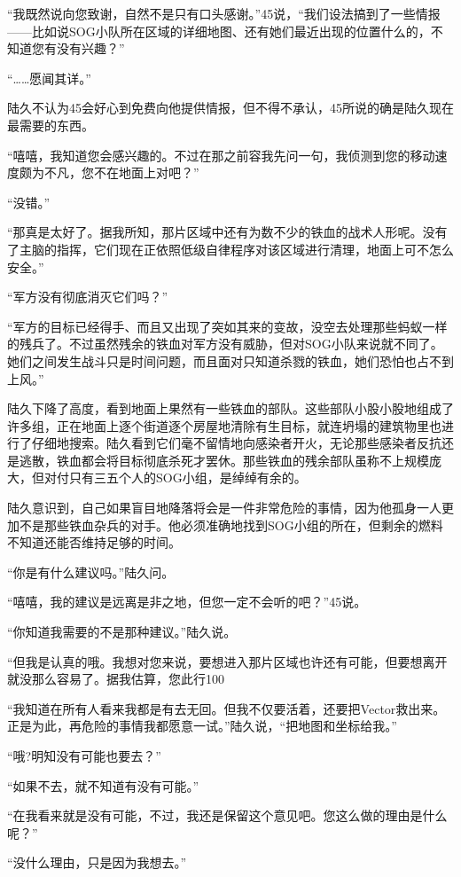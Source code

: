“我既然说向您致谢，自然不是只有口头感谢。”45说，“我们设法搞到了一些情报——比如说SOG小队所在区域的详细地图、还有她们最近出现的位置什么的，不知道您有没有兴趣？”

“……愿闻其详。”

陆久不认为45会好心到免费向他提供情报，但不得不承认，45所说的确是陆久现在最需要的东西。

“嘻嘻，我知道您会感兴趣的。不过在那之前容我先问一句，我侦测到您的移动速度颇为不凡，您不在地面上对吧？”

“没错。”

“那真是太好了。据我所知，那片区域中还有为数不少的铁血的战术人形呢。没有了主脑的指挥，它们现在正依照低级自律程序对该区域进行清理，地面上可不怎么安全。”

“军方没有彻底消灭它们吗？”

“军方的目标已经得手、而且又出现了突如其来的变故，没空去处理那些蚂蚁一样的残兵了。不过虽然残余的铁血对军方没有威胁，但对SOG小队来说就不同了。她们之间发生战斗只是时间问题，而且面对只知道杀戮的铁血，她们恐怕也占不到上风。”

陆久下降了高度，看到地面上果然有一些铁血的部队。这些部队小股小股地组成了许多组，正在地面上逐个街道逐个房屋地清除有生目标，就连坍塌的建筑物里也进行了仔细地搜索。陆久看到它们毫不留情地向感染者开火，无论那些感染者反抗还是逃散，铁血都会将目标彻底杀死才罢休。那些铁血的残余部队虽称不上规模庞大，但对付只有三五个人的SOG小组，是绰绰有余的。

陆久意识到，自己如果盲目地降落将会是一件非常危险的事情，因为他孤身一人更加不是那些铁血杂兵的对手。他必须准确地找到SOG小组的所在，但剩余的燃料不知道还能否维持足够的时间。

“你是有什么建议吗。”陆久问。

“嘻嘻，我的建议是远离是非之地，但您一定不会听的吧？”45说。

“你知道我需要的不是那种建议。”陆久说。

“但我是认真的哦。我想对您来说，要想进入那片区域也许还有可能，但要想离开就没那么容易了。据我估算，您此行100%

“我知道在所有人看来我都是有去无回。但我不仅要活着，还要把Vector救出来。正是为此，再危险的事情我都愿意一试。”陆久说，“把地图和坐标给我。”

“哦?明知没有可能也要去？”

“如果不去，就不知道有没有可能。”

“在我看来就是没有可能，不过，我还是保留这个意见吧。您这么做的理由是什么呢？”

“没什么理由，只是因为我想去。”

